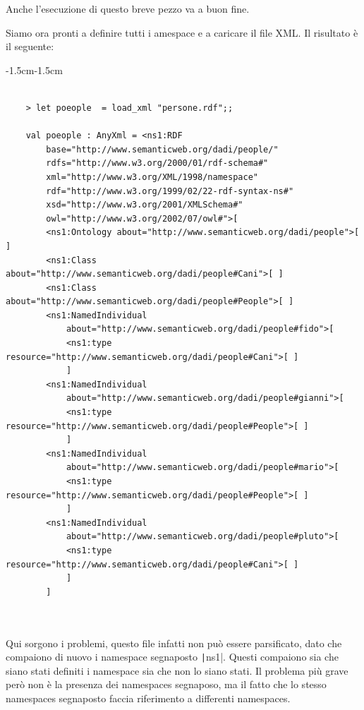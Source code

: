 \documentclass[]{article}
\begin{document}
Anche l'esecuzione di questo breve pezzo va a buon fine.

\newpage

Siamo ora pronti a definire tutti i amespace e a caricare il file XML. Il risultato è il seguente:

\begin{adjustwidth}{-1.5cm}{-1.5cm}	
	\begin{minipage}{\linewidth} 
		\begin{verbatim}
			
	> let poeople  = load_xml "persone.rdf";;
	
	val poeople : AnyXml = <ns1:RDF
		base="http://www.semanticweb.org/dadi/people/"
		rdfs="http://www.w3.org/2000/01/rdf-schema#"
		xml="http://www.w3.org/XML/1998/namespace"
		rdf="http://www.w3.org/1999/02/22-rdf-syntax-ns#"
		xsd="http://www.w3.org/2001/XMLSchema#"
		owl="http://www.w3.org/2002/07/owl#">[
		<ns1:Ontology about="http://www.semanticweb.org/dadi/people">[ ]
		<ns1:Class about="http://www.semanticweb.org/dadi/people#Cani">[ ]
		<ns1:Class about="http://www.semanticweb.org/dadi/people#People">[ ]
		<ns1:NamedIndividual
			about="http://www.semanticweb.org/dadi/people#fido">[
			<ns1:type resource="http://www.semanticweb.org/dadi/people#Cani">[ ]
			]
		<ns1:NamedIndividual
			about="http://www.semanticweb.org/dadi/people#gianni">[
			<ns1:type resource="http://www.semanticweb.org/dadi/people#People">[ ]
			]
		<ns1:NamedIndividual
			about="http://www.semanticweb.org/dadi/people#mario">[
			<ns1:type resource="http://www.semanticweb.org/dadi/people#People">[ ]
			]
		<ns1:NamedIndividual
			about="http://www.semanticweb.org/dadi/people#pluto">[
			<ns1:type resource="http://www.semanticweb.org/dadi/people#Cani">[ ]
			]
		]
			
			
		\end{verbatim}
	\end{minipage}
\end{adjustwidth}

Qui sorgono i problemi, questo file infatti non può essere parsificato, dato che compaiono di nuovo i namespace segnaposto \texttt|ns1|. Questi compaiono sia che siano stati definiti i namespace sia che non lo siano stati. Il problema più grave però non è la presenza dei namespaces segnaposo, ma il fatto che lo stesso namespaces segnaposto faccia riferimento a differenti namespaces.
\end{document}
